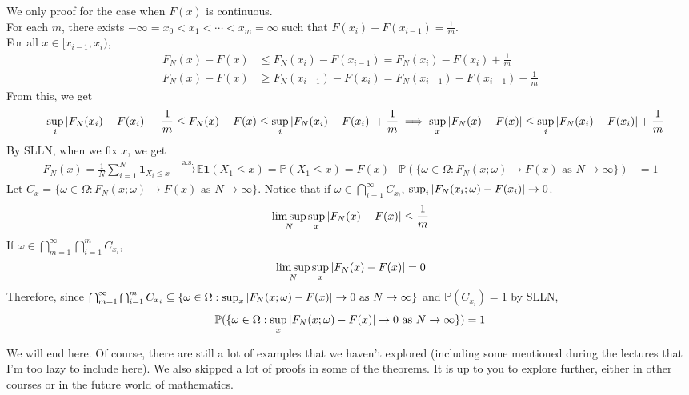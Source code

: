 \documentclass{huhtakm-template-book}
\newcommand{\prob}{\mathbb{P}}
\newcommand{\expect}{\mathbb{E}}
\begin{document}
\begin{proofing}
	We only proof for the case when $F(x)$ is continuous.\\
	For each $m$, there exists $-\infty=x_{0}<x_{1}<\cdots<x_{m}=\infty$ such that $F(x_{i})-F(x_{i-1})=\frac{1}{m}$.\\
	For all $x\in[x_{i-1},x_{i})$,
	\begin{align*}
		F_{N}(x)-F(x)&\leq F_{N}(x_{i})-F(x_{i-1})=F_{N}(x_{i})-F(x_{i})+\frac{1}{m}\\
		F_{N}(x)-F(x)&\geq F_{N}(x_{i-1})-F(x_{i})=F_{N}(x_{i-1})-F(x_{i-1})-\frac{1}{m}
	\end{align*}
	From this, we get
	\begin{equation*}
		-\sup_{i}\left|{F_{N}(x_{i})-F(x_{i})}\right|-\frac{1}{m}\leq F_{N}(x)-F(x)\leq\sup_{i}\left|{F_{N}(x_{i})-F(x_{i})}\right|+\frac{1}{m}\implies\sup_{x}\left|{F_{N}(x)-F(x)}\right|\leq\sup_{i}\left|{F_{N}(x_{i})-F(x_{i})}\right|+\frac{1}{m}
	\end{equation*}
	By SLLN, when we fix $x$, we get
	\begin{align*}
		F_{N}(x)=\frac{1}{N}\sum_{i=1}^{N}\mathbf{1}_{X_{i}\leq x}&\xrightarrow{\text{a.s.}}\expect\mathbf{1}(X_{1}\leq x)=\prob(X_{1}\leq x)=F(x) & \prob(\{\omega\in\Omega:F_{N}(x;\omega)\to F(x)\text{ as }N\to\infty\})&=1
	\end{align*}
	Let $C_{x}=\{\omega\in\Omega:F_{N}(x;\omega)\to F(x)\text{ as }N\to\infty\}$. Notice that if $\omega\in\bigcap_{i=1}^{\infty}C_{x_{i}}$, $\sup_{i}\left|{F_{N}(x_{i};\omega)-F(x_{i})}\right|\to 0$.
	\begin{equation*}
		\limsup_{N}\sup_{x}\left|{F_{N}(x)-F(x)}\right|\leq\frac{1}{m}
	\end{equation*}
	If $\omega\in\bigcap_{m=1}^{\infty}\bigcap_{i=1}^{m}C_{x_{i}}$,
	\begin{equation*}
		\limsup_{N}\sup_{x}\left|{F_{N}(x)-F(x)}\right|=0
	\end{equation*}
	Therefore, since $\bigcap_{m=1}^{\infty}\bigcap_{i=1}^{m}C_{x_{i}}\subseteq\{\omega\in\Omega:\sup_{x}\left|{F_{N}(x;\omega)-F(x)}\right|\to 0\text{ as }N\to\infty\}$ and $\prob(C_{x_{i}})=1$ by SLLN,
	\begin{equation*}
		\prob(\{\omega\in\Omega:\sup_{x}\abs{F_{N}(x;\omega)-F(x)}\to 0\text{ as }N\to\infty\})=1
	\end{equation*}
\end{proofing}
We will end here. Of course, there are still a lot of examples that we haven't explored (including some mentioned during the lectures that I'm too lazy to include here). We also skipped a lot of proofs in some of the theorems. It is up to you to explore further, either in other courses or in the future world of mathematics.
\end{document}
